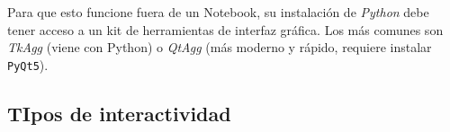 \begin{nota}
Para que esto funcione fuera de un Notebook, su instalación de \textit{Python} debe tener acceso a un kit de herramientas de interfaz gráfica. Los más comunes son \textit{TkAgg} (viene con Python) o \textit{QtAgg} (más moderno y rápido, requiere instalar \texttt{PyQt5}).
\end{nota}


\subsection{TIpos de interactividad}

\subsubsection{}

